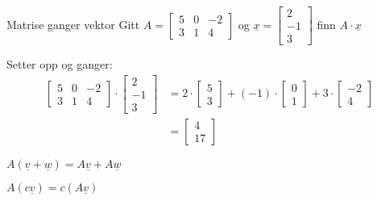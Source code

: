 \documentclass[11pt, a4paper, norsk]{article}
\begin{document}
        \begin{Example}{Matrise ganger vektor}{}
            Gitt $A = \begin{bmatrix}
                5 & 0 & -2 \\
                3 & 1 & 4
            \end{bmatrix}$ og $\underline{x} = \begin{bmatrix}
                2 \\
                -1 \\
                3
            \end{bmatrix}$ finn $A \cdot \underline{x}$

            Setter opp og ganger:
            \begin{align*}
                \begin{bmatrix}
                    5 & 0 & -2 \\
                    3 & 1 & 4
                \end{bmatrix} \cdot \begin{bmatrix}
                    2 \\
                    -1 \\
                    3
                \end{bmatrix} &= 2 \cdot \begin{bmatrix}
                    5 \\
                    3
                \end{bmatrix} + (-1) \cdot \begin{bmatrix}
                0 \\
                1
                \end{bmatrix} + 3 \cdot \begin{bmatrix}
                    -2 \\
                    4
                \end{bmatrix}
                \\
                &= \begin{bmatrix}
                    4 \\
                    17
                \end{bmatrix}
            \end{align*}
        \end{Example}
        
        \begin{Theorem}{}{}
            $A(\underline{v} + \underline{w}) = A\underline{v} + A\underline{w}$

            $A(c\underline{v}) = c(A\underline{v})$
        \end{Theorem}
        
\end{document}
